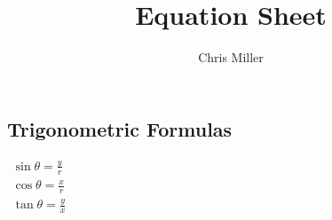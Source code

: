 \documentclass[10pt,letterpaper]{article}
\begin{document}
\title{Equation Sheet}
\author{Chris Miller}

\newcommand{\sech}{\text{sech}}
\newcommand{\csch}{\text{csch}}

															\subsection*{Trigonometric Formulas}
\begin{center}\begin{minipage}[center]{340pt}
\begin{minipage}[left]{200pt}

\end{minipage}
\begin{minipage}[right]{120pt}
$ \begin{array}{l}
				  \sin \theta = \frac{y}{r} \\
				  \cos \theta = \frac{x}{r} \\
				  \tan \theta = \frac{y}{x}
				 \end{array} $ \hfill
\end{minipage}\end{minipage}\end{center}
\end{document}
